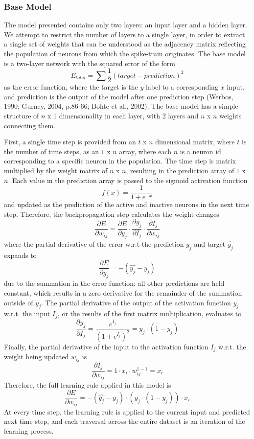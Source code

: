\documentclass[11pt,titlepage]{article}
\begin{document}
\subsubsection{Base Model}\label{sssec:BM}
The model presented contains only two layers: an input layer and a hidden layer. We attempt to restrict the number of layers to a single layer, in order to extract a single set of weights that can be understood as the adjacency matrix reflecting the population of neurons from which the spike-train originates. The base model is a two-layer network with the squared error of the form $$E_{total} = \sum{\frac{1}{2}(target-prediction)^2}$$ as the error function, where the target is the $y$ label to a corresponding $x$ input, and prediction is the output of the model after one prediction step (Werbos, 1990; Gurney, 2004, p.86-66; Bohte et al., 2002). The base model has a simple structure of $n$ x 1 dimensionality in each layer, with 2 layers and $n$ x $n$ weights connecting them.\par
First, a single time step is provided from an $t$ x $n$ dimensional matrix, where $t$ is the number of time steps, as an $1$ x $n$ array, where each $n$ is a neuron id corresponding to a specific neuron in the population. The time step is matrix multiplied by the weight matrix of $n$ x $n$, resulting in the prediction array of $1$ x $n$. Each value in the prediction array is passed to the sigmoid activation function $$ f(x) = \frac{1}{1 + e^{-x}}$$ and updated as the prediction of the active and inactive neurons in the next time step. Therefore, the backpropagation step calculates the weight changes $$\frac{\partial E}{\partial w_{ij}} = \frac{\partial E}{\partial y_j} \cdot \frac{\partial y_j}{\partial I_{j}} \cdot \frac{\partial I_{j}}{\partial w_{ij}}$$ where the partial derivative of the error w.r.t the prediction $y_j$ and target $\hat{y_j}$ expands to $$\frac{\partial E}{\partial y_j} = -(\hat{y_j} - y_j) $$ due to the summation in the error function; all other predictions are held constant, which results in a zero derivative for the remainder of the summation outside of $y_j$. The partial derivative of the output of the activation function $y_j$ w.r.t. the input $I_j$, or the results of the first matrix multiplication, evaluates to $$\frac{\partial y_j}{\partial I_j} = \frac{e^{I_j}}{(1+e^{I_j})^2} = y_j \cdot (1 - y_j)$$ Finally, the partial derivative of the input to the activation function $I_j$ w.r.t. the weight being updated $w_{ij}$ is $$\frac{\partial I_j}{\partial w_{ij}} = 1 \cdot x_i \cdot w_{ij}^{1-1} = x_i$$ Therefore, the full learning rule applied in this model is $$ \frac{\partial E}{\partial w_{ij}} = -(\hat{y_j}-y_j) \cdot (y_j \cdot (1-y_j))\cdot x_i$$ At every time step, the learning rule is applied to the current input and predicted next time step, and each traversal across the entire dataset is an iteration of the learning process.\par
\end{document}
